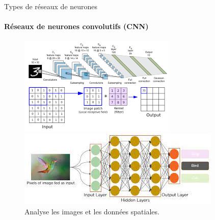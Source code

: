 \documentclass{beamer}
\begin{document}
\begin{frame}{Types de réseaux de neurones}
	\framesubtitle{Réseaux de neurones convolutifs (CNN)}
	\begin{figure}[h]
		\centering
		\begin{minipage}{0.5\textwidth}
			\centering
			\includegraphics[width=\linewidth]{chiffre.png}
		\end{minipage}\hfill
		\begin{minipage}{0.5\textwidth}
			\centering
			\includegraphics[width=\linewidth]{oiseau.jpeg}
		\end{minipage}
		\caption{Analyse les images et les données spatiales.}
	\end{figure}
\end{frame}	
\end{document}
